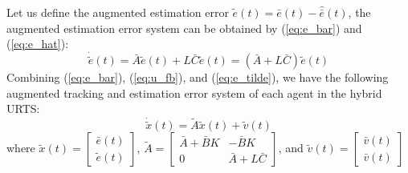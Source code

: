 \documentclass[journal,12pt,onecolumn,draftclsnofoot,]{IEEEtran}
\begin{document}
Let us define the augmented estimation error $\tilde{e}(t)=\bar{e}(t)-\hat{\bar{e}}(t)$, the augmented estimation error system can be obtained by (\ref{eq:e_bar}) and (\ref{eq:e_hat}):
\begin{equation} \label{eq:e_tilde}
    \dot{\tilde{e}}(t) = \bar{A}\tilde{e}(t) +L\bar{C}\tilde{e}(t) = (\bar{A} +L\bar{C})\tilde{e}(t)
\end{equation}
Combining (\ref{eq:e_bar}), (\ref{eq:u_fb}), and (\ref{eq:e_tilde}), we have the following augmented tracking and estimation error system of each agent in the hybrid URTS:
\begin{equation} \label{eq:x_tilde}
    \dot{\tilde{x}}(t) = \tilde{A}\tilde{x}(t)+\tilde{v}(t)
\end{equation}
where $\tilde{x}(t)=\begin{bmatrix}
    \bar{e}(t) \\ \tilde{e}(t)
\end{bmatrix}$, $\tilde{A}=\begin{bmatrix}
    \bar{A}+\bar{B}K & -\bar{B}K \\ 0 & \bar{A}+L\bar{C}
\end{bmatrix}$, and $\tilde{v}(t)=\begin{bmatrix}
    \bar{v}(t) \\ \bar{v}(t)
\end{bmatrix}$
\end{document}

